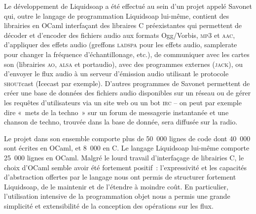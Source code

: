 \documentclass[twoside]{article}
\newcommand{\liquidsoap}{Liquidsoap}
\newcommand{\savonet}{Savonet}
\theoremstyle{plain}
\theoremstyle{definition}
\theoremstyle{remark}
\begin{document}
Le développement de \liquidsoap{} a été effectué au sein d'un projet appelé
\savonet{} qui, outre le langage de programmation \liquidsoap{} lui-même,
contient des librairies en OCaml interfaçant des libraires C préexistantes
qui permettent de décoder et d'encoder des fichiers audio aux formats Ogg/Vorbis,
\textsc{mp3} et \textsc{aac}, d'appliquer des effets audio (greffons
\textsc{ladspa} pour les effets audio, samplerate pour changer la
fréquence d'échantillonage, etc.), de communiquer avec les cartes son
(librairies \textsc{ao}, \textsc{alsa} et portaudio), avec des programmes
externes (\textsc{jack}), ou d'envoyer le flux audio à un serveur d'émission
audio utilisant le protocole \textsc{shout}cast (Icecast par exemple).
D'autres programmes de \savonet{} permettent de créer une base de données des
fichiers audio disponibles sur un réseau ou de gérer les requêtes d'utilisateurs
via un site web ou un bot \textsc{irc} -- on peut par exemple dire «~mets
de la techno~» sur un forum de messagerie instantanée et une chanson de techno,
trouvée dans la base de donnée, sera diffusée sur la radio.

Le projet dans son ensemble comporte plus de 50~000 lignes de code dont 40~000
sont écrites en OCaml, et 8~000 en C. Le langage \liquidsoap{} lui-même comporte
25~000 lignes en OCaml. Malgré le lourd travail d'interfaçage de librairies C,
le choix d'OCaml semble avoir été fortement positif~: l'expressivité et les
capacités d'abstraction offertes par le langage nous ont permis de structurer
fortement \liquidsoap{}, de le maintenir et de l'étendre à moindre coût. En
particulier, l'utilisation intensive de la programmation objet nous a permis une
grande simplicité et extensibilité de la conception des opérations sur les flux.

\end{document}
